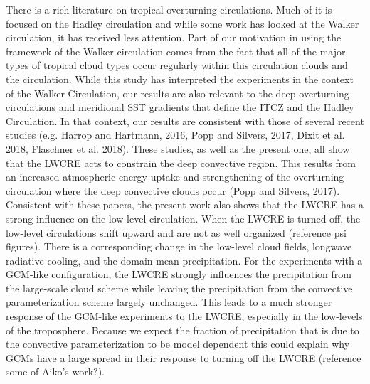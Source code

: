 \documentclass[draft]{agujournal2019}
\begin{document}
There is a rich literature on tropical overturning circulations.  Much of it is focused on the Hadley circulation and while some
work has looked at the Walker circulation, it has received less attention.  Part of our motivation in using the framework of the 
Walker circulation comes from the fact that all of the major types of tropical cloud types occur regularly within this circulation
clouds and the circulation.  While this study has interpreted the experiments in the context of the Walker Circulation, our results 
are also relevant to the deep overturning circulations and meridional SST gradients that define the ITCZ and the Hadley 
Circulation.  In that context, our results are consistent with those of several recent studies (e.g. Harrop and Hartmann, 2016, 
Popp and Silvers, 2017, Dixit et al. 2018, Flaschner et al. 2018).  These studies, as well as the present one, all show that the 
LWCRE acts to constrain the deep convective region.  This results from an increased atmospheric energy uptake and 
strengthening of the overturning circulation where the deep convective clouds occur (Popp and Silvers, 2017).  Consistent with 
these papers, the present work also shows that the LWCRE has a strong influence on the low-level circulation.   When 
the LWCRE is turned off, the low-level circulations shift upward and are not as well organized (reference psi figures).
There is a corresponding change in the low-level cloud fields, longwave radiative cooling, and the domain mean precipitation.
For the experiments with a GCM-like configuration, the LWCRE strongly influences the precipitation from the large-scale
cloud scheme while leaving the precipitation from the convective parameterization scheme largely unchanged.  This leads 
to a much stronger response of the GCM-like experiments to the LWCRE, especially in the low-levels of the troposphere.  
Because we expect the fraction of precipitation that is due to the convective parameterization to be model dependent 
this could explain why GCMs have a large spread in their response to turning off the LWCRE (reference some 
of Aiko's work?). 
\end{document}

